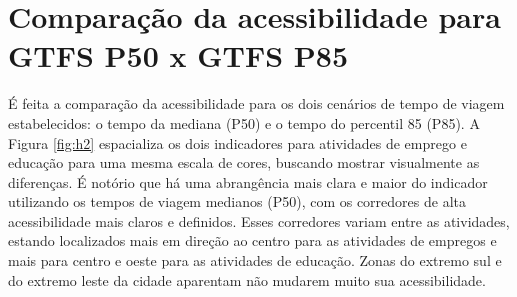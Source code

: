 \documentclass[        
    a4paper,          %
    12pt,             %
    chapter=TITLE,    %
    section=Title,    %
    subsection=Title, %
    oneside,          %
    english,          %
    spanish,          %
    brazil,           %
    fleqn             %
]{abntex2}
\begin{document}
  \hypertarget{comparacao-da-acessibilidade-para-gtfs-p50-x-gtfs-p85}{%
  \section{Comparação da acessibilidade para GTFS P50 x GTFS P85}\label{comparacao-da-acessibilidade-para-gtfs-p50-x-gtfs-p85}}
  
  É feita a comparação da acessibilidade para os dois cenários de tempo de viagem estabelecidos: o tempo da mediana (P50) e o tempo do percentil 85 (P85). A Figura \ref{fig:h2} espacializa os dois indicadores para atividades de emprego e educação para uma mesma escala de cores, buscando mostrar visualmente as diferenças. É notório que há uma abrangência mais clara e maior do indicador utilizando os tempos de viagem medianos (P50), com os corredores de alta acessibilidade mais claros e definidos. Esses corredores variam entre as atividades, estando localizados mais em direção ao centro para as atividades de empregos e mais para centro e oeste para as atividades de educação. Zonas do extremo sul e do extremo leste da cidade aparentam não mudarem muito sua acessibilidade.
  
  \begin{figure}[!h]
  \captionsetup{width=16cm}
  \centering
  \end{figure}
  
\end{document}
